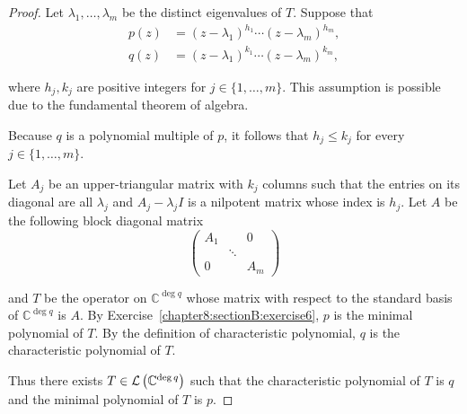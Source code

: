 \begin{proof}
    Let $\lambda_{1}, \ldots, \lambda_{m}$ be the distinct eigenvalues of $T$. Suppose that
    \begin{align*}
        p(z) & = {(z - \lambda_{1})}^{h_{1}}\cdots {(z - \lambda_{m})}^{h_{m}}, \\
        q(z) & = {(z - \lambda_{1})}^{k_{1}}\cdots {(z - \lambda_{m})}^{k_{m}},
    \end{align*}

    where $h_{j}, k_{j}$ are positive integers for $j\in\{1,\ldots,m\}$. This assumption is possible due to the fundamental theorem of algebra.

    Because $q$ is a polynomial multiple of $p$, it follows that $h_{j}\leq k_{j}$ for every $j\in\{1,\ldots,m\}$.

    Let $A_{j}$ be an upper-triangular matrix with $k_{j}$ columns such that the entries on its diagonal are all $\lambda_{j}$ and $A_{j} - \lambda_{j}I$ is a nilpotent matrix whose index is $h_{j}$. Let $A$ be the following block diagonal matrix
    \[
        \begin{pmatrix}
            A_{1} &        & 0     \\
                  & \ddots &       \\
            0     &        & A_{m}
        \end{pmatrix}
    \]

    and $T$ be the operator on $\mathbb{C}^{\deg q}$ whose matrix with respect to the standard basis of $\mathbb{C}^{\deg q}$ is $A$. By Exercise~\ref{chapter8:sectionB:exercise6}, $p$ is the minimal polynomial of $T$. By the definition of characteristic polynomial, $q$ is the characteristic polynomial of $T$.

    Thus there exists $T\in\mathcal{L}\left({\mathbb{C}^{\deg q}}\right)$ such that the characteristic polynomial of $T$ is $q$ and the minimal polynomial of $T$ is $p$.
\end{proof}
\newpage

